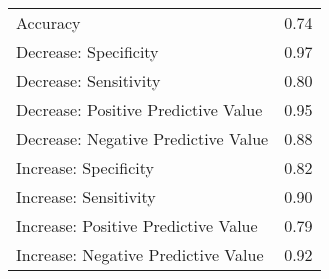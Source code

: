 \begin{table}[ht]
\centering
\begin{tabular}{lr}
  \hline
 &  \\ 
  \hline
Accuracy & 0.74 \\ 
  Decrease: Specificity & 0.97 \\ 
  Decrease: Sensitivity & 0.80 \\ 
  Decrease: Positive Predictive Value & 0.95 \\ 
  Decrease: Negative Predictive Value & 0.88 \\ 
  Increase: Specificity & 0.82 \\ 
  Increase: Sensitivity & 0.90 \\ 
  Increase: Positive Predictive Value & 0.79 \\ 
  Increase: Negative Predictive Value & 0.92 \\ 
   \hline
\end{tabular}
\end{table}
